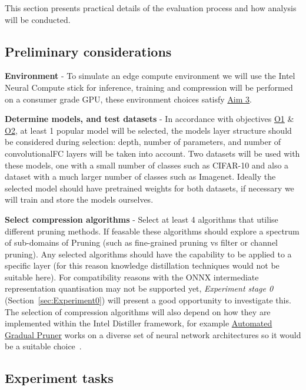 \documentclass[../D1.tex]{subfiles}
\begin{document}
This section presents practical details of the evaluation process and how analysis will be conducted. 

\subsection{Preliminary considerations}
\textbf{Environment} - To simulate an edge compute environment we will use the Intel Neural Compute stick for inference, training and compression will be performed on a consumer grade GPU, these environment choices satisfy \hyperref[Aim3]{Aim 3}.

\textbf{Determine models, and test datasets} - In accordance with objectives \hyperref[obj:ModelSel]{O1} \& \hyperref[obj:DataSel]{O2}, at least 1 popular model will be selected, the models layer structure should be considered during selection: depth, number of parameters, and number of convolutional\/FC layers will be taken into account. 
Two datasets will be used with these models, one with a small number of classes such as CIFAR-10 and also a dataset with a much larger number of classes such as Imagenet. Ideally the selected model should have pretrained weights for both datasets, if necessary we will train and store the models ourselves.

\textbf{Select compression algorithms} - Select at least 4 algorithms that utilise different pruning methods. If feasable these algorithms should explore a spectrum of sub-domains of Pruning (such as fine-grained pruning vs filter or channel pruning). Any selected algorithms should have the capability to be applied to a specific layer (for this reason knowledge distillation techniques would not be suitable here).
For compatibility reasons with the ONNX intermediate representation quantisation may not be supported yet, \emph{Experiment stage 0} (Section~\ref{sec:Experiment0}) will present a good opportunity to investigate this.
The selection of compression algorithms will also depend on how they are implemented within the Intel Distiller framework, for example \href{https://github.com/IntelLabs/distiller/blob/master/distiller/pruning/automated_gradual_pruner.py}{Automated Gradual Pruner} works on a diverse set of neural network architectures so it would be a suitable choice~\autocite{zhuPruneNotPrune2017}.

\newpage
\subsection{Experiment tasks}\label{sec:ExperimentTasks}
\end{document}
